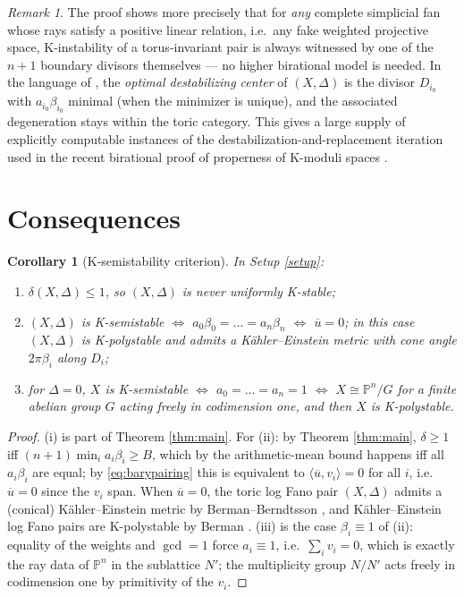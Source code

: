 \documentclass[11pt]{amsart}
\newtheorem{corollary}[theorem]{Corollary}
\theoremstyle{definition}
\theoremstyle{remark}
\newtheorem{remark}[theorem]{Remark}
\newcommand{\PP}{\mathbb{P}}
\newcommand{\bary}{\overline{u}}
\begin{document}
\begin{remark}\label{rem:degenerate}
The proof shows more precisely that for \emph{any} complete simplicial
fan whose rays satisfy a positive linear relation, i.e.\ any fake weighted
projective space, K-instability of a torus-invariant pair is always
witnessed by one of the \(n+1\) boundary divisors themselves --- no
higher birational model is needed. In the language of
\cite{Zhu21,BLXZ25}, the \emph{optimal destabilizing center} of
\((X,\Delta)\) is the divisor \(D_{i_0}\) with \(a_{i_0}\beta_{i_0}\)
minimal (when the minimizer is unique), and the associated degeneration
stays within the toric category. This gives a large supply of explicitly
computable instances of the destabilization-and-replacement iteration
used in the recent birational proof of properness of K-moduli spaces
\cite{BLXZ25}.
\end{remark}

\section{Consequences}\label{sec:consequences}

\begin{corollary}[K-semistability criterion]\label{cor:kss}
In Setup \textup{\ref{setup}}:
\begin{enumerate}[label=\textup{(\roman*)}]
\item \(\delta(X,\Delta)\le1\), so \((X,\Delta)\) is never uniformly
K-stable;
\item \((X,\Delta)\) is K-semistable \(\iff\)
\(a_0\beta_0=\dots=a_n\beta_n\) \(\iff\) \(\bary=0\); in this case
\((X,\Delta)\) is K-polystable and admits a K\"ahler--Einstein metric
with cone angle \(2\pi\beta_i\) along \(D_i\);
\item for \(\Delta=0\), \(X\) is K-semistable \(\iff\)
\(a_0=\dots=a_n=1\) \(\iff\) \(X\cong\PP^n/G\) for a finite abelian
group \(G\) acting freely in codimension one, and then \(X\) is
K-polystable.
\end{enumerate}
\end{corollary}

\begin{proof}
(i) is part of Theorem \ref{thm:main}. For (ii): by Theorem
\ref{thm:main}, \(\delta\ge1\) iff \((n+1)\min_ia_i\beta_i\ge B\), which
by the arithmetic-mean bound happens iff all \(a_i\beta_i\) are equal; by
\eqref{eq:barypairing} this is equivalent to
\(\langle\bary,v_i\rangle=0\) for all \(i\), i.e.\ \(\bary=0\) since the
\(v_i\) span. When \(\bary=0\), the toric log Fano pair \((X,\Delta)\)
admits a (conical) K\"ahler--Einstein metric by Berman--Berndtsson
\cite{BB13}, and K\"ahler--Einstein log Fano pairs are K-polystable by
Berman \cite{Ber16}. (iii) is the case \(\beta_i\equiv1\) of (ii):
equality of the weights and \(\gcd=1\) force \(a_i\equiv1\), i.e.\
\(\sum_iv_i=0\), which is exactly the ray data of \(\PP^n\) in the
sublattice \(N'\); the multiplicity group \(N/N'\) acts freely in
codimension one by primitivity of the \(v_i\).
\end{proof}
\end{document}

